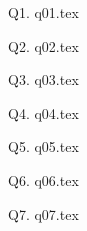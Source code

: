 


\newcommand\myincludetex[1]{\textbox{{\scriptsize \texttt{#1}}}


    

}

\newcommand\myincludesrc[1]{\textbox{{\scriptsize \texttt{#1}}}


    \VerbatimInput[fontsize=\footnotesize,frame=single]{#1}

}
    

        
        
\newpage
        

        
        
\newpage
        

        Q1. {q01.tex}
        
\newpage
        

        Q2. {q02.tex}
        
\newpage
        

        Q3. {q03.tex}
        
\newpage
        

        Q4. {q04.tex}
        
\newpage
        

        Q5. {q05.tex}
        
\newpage
        

        Q6. {q06.tex}
        
\newpage
        

        Q7. {q07.tex}
        

        

        
    